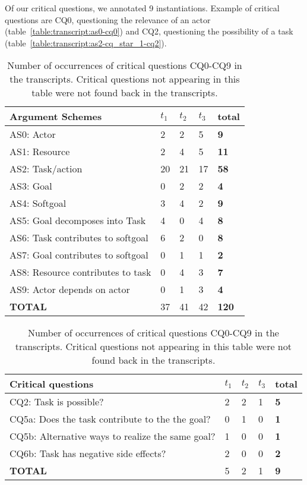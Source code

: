 Of our critical questions, we annotated 9 instantiations. Example of critical questions are CQ0, questioning the relevance of an actor (table~\ref{table:transcript:as0-cq0}) and CQ2, questioning the possibility of a task (table~\ref{table:transcript:as2-cq_star_1-cq2}).

\begin{table}[ht]
\centering
\begin{tabular}{|l|l|l|l|>{\bfseries}l|}
\hline
\textbf{Argument Schemes} & $t_1$ & $t_2$ & $t_3$ & \textbf{total}\\
\hline 
AS0: Actor & 2 & 2 & 5 & 9\\
\hline
AS1: Resource & 2 & 4 & 5 & 11\\
\hline
AS2: Task/action & 20 & 21 & 17 & 58\\
\hline
AS3: Goal & 0 & 2 & 2 & 4\\
\hline
AS4: Softgoal & 3 & 4 & 2 & 9\\
\hline
AS5: Goal decomposes into Task & 4 &0& 4 & 8\\
\hline
AS6: Task contributes to softgoal & 6 & 2 &0& 8\\
\hline
AS7: Goal contributes to softgoal &0& 1 & 1 & 2\\
\hline
AS8: Resource contributes to task & 0 & 4 & 3 & 7\\
\hline
AS9: Actor depends on actor &0& 1 & 3 & 4\\
\hline
\hline
\textbf{TOTAL} & 37& 41 & 42 & 120\\
\hline
\end{tabular}
\caption{Number of occurrences of AS0-AS9 in the transcripts.}
\label{table:transcripts:results:argumentschemes}

\begin{tabular}{|l|l|l|l|>{\bfseries}l|}
\hline
\textbf{Critical questions} & $t_1$ & $t_2$ & $t_3$ & \textbf{total}\\
\hline 			
CQ2: Task is possible? & 2 & 2 & 1 & 5\\
\hline		
CQ5a: Does the task contribute to the the goal? & 0 & 1 & 0 & 1\\
\hline
CQ5b: Alternative ways to realize the same goal? & 1 & 0 & 0 & 1\\
\hline
CQ6b: Task has negative side effects? & 2 & 0 & 0 & 2\\
\hline
\hline
\textbf{TOTAL} & 5 & 2 & 1 & 9\\
\hline
\end{tabular}
\caption{Number of occurrences of critical questions CQ0-CQ9 in the transcripts. Critical questions not appearing in this table were not found back in the transcripts.}
\label{table:transcripts:results:criticalquestions}
\end{table}

